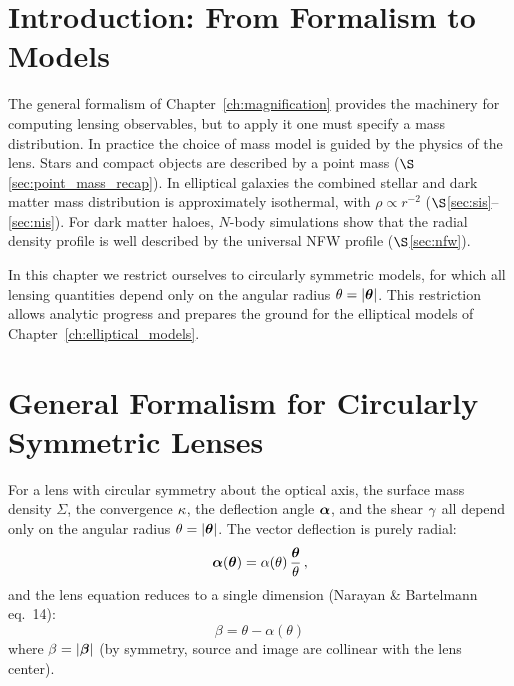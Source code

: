 \section{Introduction: From Formalism to Models}
\label{sec:axi_intro}

The general formalism of Chapter~\ref{ch:magnification} provides the
machinery for computing lensing observables, but to apply it one
must specify a mass distribution.  In practice the choice of mass
model is guided by the physics of the lens.  Stars and compact objects
are described by a point mass ($\S$\ref{sec:point_mass_recap}).  In
elliptical galaxies the combined stellar and dark matter mass
distribution is approximately isothermal, with
$\rho \propto r^{-2}$ ($\S$\ref{sec:sis}--\ref{sec:nis}).  For dark
matter haloes, $N$-body simulations show that the radial density
profile is well described by the universal NFW profile
($\S$\ref{sec:nfw}).

In this chapter we restrict ourselves to circularly symmetric
models, for which all lensing quantities depend only on the angular
radius $\theta = |\boldsymbol{\theta}|$.  This restriction allows analytic
progress and prepares the ground for the elliptical models of
Chapter~\ref{ch:elliptical_models}.


\section{General Formalism for Circularly Symmetric Lenses}
\label{sec:circular_formalism}

For a lens with circular symmetry about the optical axis, the surface
mass density $\Sigma$, the convergence $\kappa$, the deflection angle
$\boldsymbol{\alpha}$, and the shear $\gamma$ all depend only on the angular
radius $\theta = |\boldsymbol{\theta}|$.  The vector deflection is purely radial:
\begin{equation}
    \boldsymbol{\alpha}(\boldsymbol{\theta}) = \alpha(\theta)\,\frac{\boldsymbol{\theta}}{\theta} \,,
    \label{eq:alpha_radial}
\end{equation}
and the lens equation reduces to a single dimension
(Narayan \& Bartelmann eq.~14):
\begin{equation}
    \boxed{
    \beta = \theta - \alpha(\theta)
    }
    \label{eq:lens_eq_1d}
\end{equation}
where $\beta = |\boldsymbol{\beta}|$ (by symmetry, source and image are collinear
with the lens center).

